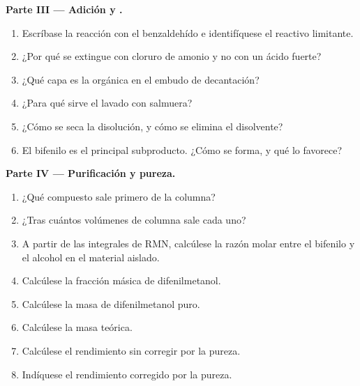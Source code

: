 \begin{problem}
\medskip
\noindent\textbf{Parte III --- Adición y .}
\begin{enumerate}[resume]
  \item Escríbase la reacción con el benzaldehído e identifíquese el reactivo limitante.
  \item ¿Por qué se extingue con cloruro de amonio y no con un ácido fuerte?
  \item ¿Qué capa es la orgánica en el embudo de decantación?
  \item ¿Para qué sirve el lavado con salmuera?
  \item ¿Cómo se seca la disolución, y cómo se elimina el disolvente?
  \item El bifenilo es el principal subproducto. ¿Cómo se forma, y qué lo favorece?
\end{enumerate}

\medskip
\noindent\textbf{Parte IV --- Purificación y pureza.}
\begin{enumerate}[resume]
  \item ¿Qué compuesto sale primero de la columna?
  \item ¿Tras cuántos volúmenes de columna sale cada uno?
  \item A partir de las integrales de RMN, calcúlese la razón molar entre el bifenilo y el alcohol en el material
        aislado.
  \item Calcúlese la fracción másica de difenilmetanol.
  \item Calcúlese la masa de difenilmetanol puro.
  \item Calcúlese la masa teórica.
  \item Calcúlese el rendimiento sin corregir por la pureza.
  \item Indíquese el rendimiento corregido por la pureza.
\end{enumerate}
\end{problem}
